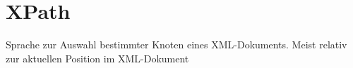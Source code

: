 \chapter{XPath}

Sprache zur Auswahl bestimmter Knoten eines XML-Dokuments. Meist relativ zur aktuellen Position im XML-Dokument